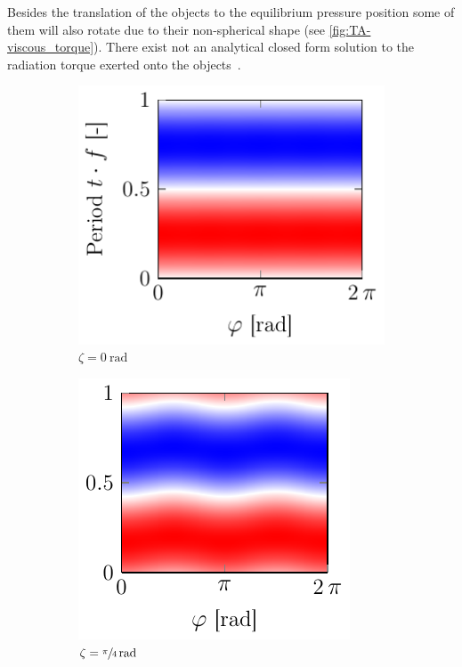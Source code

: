 Besides the translation of the objects to the equilibrium pressure position 
some of them will also rotate due to their non-spherical shape (see 
\cref{fig:TA-viscous_torque}). There exist not an analytical closed form 
solution to the radiation torque exerted onto the objects~\cite{Lamprecht2017}.

 \begin{figure}
  \centering
  \begin{subfigure}[b]{0.35\textwidth}
    \centering
    \caption{$\zeta = \SI{0}{\radian}$}
    \includegraphics[]{External/viscous_torque_0.pdf}
  \end{subfigure}
  \hfill
  \begin{subfigure}[b]{0.3\textwidth}
    \centering
    \caption{$\zeta = \sfrac{\pi}{4}\,\si{\radian}$}
    \includegraphics[]{External/viscous_torque_1.pdf}
  \end{subfigure}
  \hfill
  \begin{subfigure}[b]{0.3\textwidth}

\end{subfigure}
\end{figure}
